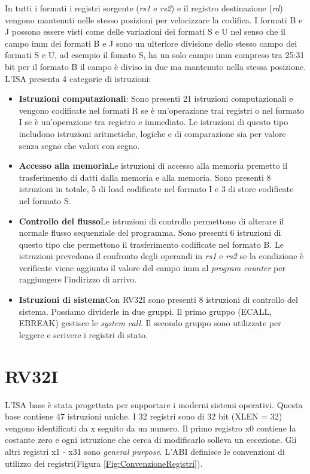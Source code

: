 \documentclass[12pt,a4paper]{report}
\begin{document}
In tutti i formati i registri sorgente (\textit{rs1} e \textit{rs2}) e il registro destinazione (\textit{rd}) vengono mantenuti nelle stesso posizioni per velocizzare la codifica.
I formati B e J possono essere visti come delle variazioni dei formati S e U nel senso che il campo imm dei formati B e J sono un ulteriore divisione dello stesso campo dei formati S e U,  ad esempio il fomato S, ha un solo campo imm compreso tra 25:31 bit per il formato B il campo è diviso in due ma mantenuto nella stessa posizione.  L'ISA presenta 4 categorie di istruzioni:
\begin{itemize}
	\item \textbf{Istruzioni computazionali}: Sono presenti 21 istruzioni computazionali e vengono codificate nel formati R se è un'operazione trai registri o nel formato I se è un'operazione tra registro e immediato. Le istruzioni di questo tipo includono istruzioni aritmetiche, logiche e di comparazione sia per valore senza segno che valori con segno.
	\item \textbf{Accesso alla memoria}Le istruzioni di accesso alla memoria premetto il trasferimento di datti dalla memoria e alla memoria. Sono presenti 8 istruzioni in totale, 5 di load codificate nel formato I e 3 di store codificate nel formato S.
	\item \textbf{Controllo del flusso}Le istruzioni di controllo permettono di alterare il normale flusso sequenziale del programma. Sono presenti 6 istruzioni di questo tipo che permettono il trasferimento codificate nel formato B. Le istruzioni prevedono il confronto degli operandi in \textit{rs1} e \textit{rs2} se la condizione  è verificate viene aggiunto il valore del campo imm al \textit{program counter} per raggiungere l'indirizzo di arrivo.
	\item \textbf{Istruzioni di sistema}Con RV32I sono presenti 8 istruzioni di controllo del sistema. Possiamo dividerle in due gruppi. Il primo gruppo (ECALL, EBREAK) gestisce  le \textit{system call}. Il secondo gruppo sono utilizzate per leggere e scrivere i registri di stato.
\end{itemize}


\section{RV32I}
L'ISA base è stata progettata per supportare i moderni sistemi operativi. Questa base contiene 47 istruzioni uniche.  I 32 registri sono di 32 bit (XLEN = 32) vengono identificati da x seguito da un numero. Il primo registro x0 contiene la costante zero e ogni istruzione che cerca di modificarlo solleva un eccezione. Gli altri registri x1 - x31 sono \textit{general purpose}.  L'ABI definisce le convenzioni di utilizzo dei registri(Figura \ref{Fig:ConvenzioneRegistri}).
\end{document}

